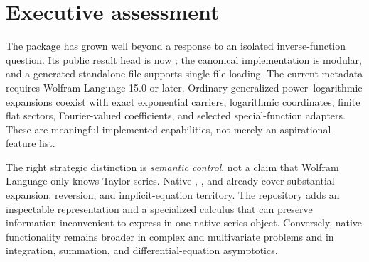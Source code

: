 \documentclass[11pt,a4paper]{article}
\newcommand{\code}[1]{\texttt{\detokenize{#1}}}
\begin{document}
\begin{abstract}
This article reviews the pinned 1.8.0 implementation of the Asymptotic repository, compares its public contract with current official Wolfram documentation, and develops concrete, reproducible improvement proposals. The review examines the ordinary expansion and inversion core, series operations and refinement, arithmetic dispatch, native special-function import, branch handling, interval certificates, incremental inversion, and the Gamma/Barnes inverse constructor, together with public documentation and validation records. It identifies several source-level resource and contract problems without conflating them with numerical failures that were not observed. Two particularly clear examples are a sparse input that triggers an arbitrarily large temporary dense coefficient array, and a Newton request whose mandatory multi-index preprocessing exceeds 20,000 entries although only 142 distinct retained weights exist. Independent exact Python models verify the combinatorial counts, coefficient formulas, and a cutoff-aware powering alternative. The proposed development program prioritizes trustworthy domain and precision contracts, method-specific work planning, bounded interoperability, native regression gates, and explicit capability discovery before wider transseries generalization.
\end{abstract}
\tableofcontents
\clearpage

\section{Executive assessment}

The package has grown well beyond a response to an isolated inverse-function question. Its public result head is now \code{GeneralizedSeries}; the canonical implementation is modular, and a generated standalone file supports single-file loading. The current metadata requires Wolfram Language 15.0 or later. Ordinary generalized power--logarithmic expansions coexist with exact exponential carriers, logarithmic coordinates, finite flat sectors, Fourier-valued coefficients, and selected special-function adapters. These are meaningful implemented capabilities, not merely an aspirational feature list.\cite{readme,paclet,guide}

The right strategic distinction is \emph{semantic control}, not a claim that Wolfram Language only knows Taylor series. Native \code{Series}, \code{InverseSeries}, and \code{AsymptoticSolve} already cover substantial expansion, reversion, and implicit-equation territory. The repository adds an inspectable representation and a specialized calculus that can preserve information inconvenient to express in one native series object. Conversely, native functionality remains broader in complex and multivariate problems and in integration, summation, and differential-equation asymptotics.\cite{wl-series,wl-inverse,wl-solve,wl-asymptotic}
\end{document}
